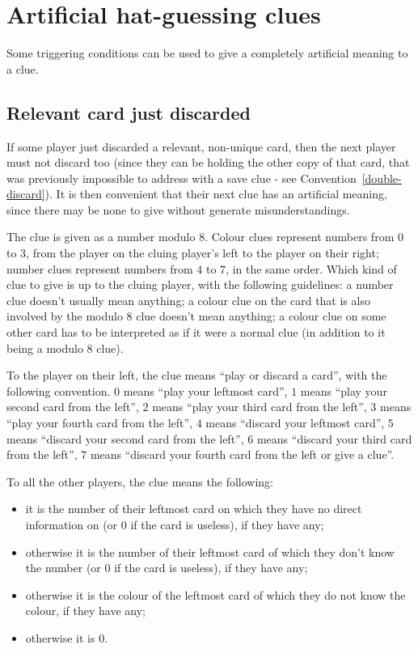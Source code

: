 \documentclass[a4paper]{article}
\theoremstyle{plain}
\theoremstyle{definition}
\begin{document}
\section{Artificial hat-guessing clues}
\label{sec:mod8}

Some triggering conditions can be used to give a completely artificial meaning to a clue.

\subsection{Relevant card just discarded}

If some player just discarded a relevant, non-unique card, then the next player must not discard too (since they can be holding the other copy of that card, that was previously impossible to address with a save clue - see Convention~\ref{double-discard}). It is then convenient that their next clue has an artificial meaning, since there may be none to give without generate misunderstandings.

The clue is given as a number modulo 8. Colour clues represent numbers from $0$ to $3$, from the player on the cluing player's left to the player on their right; number clues represent numbers from $4$ to $7$, in the same order. Which kind of clue to give is up to the cluing player, with the following guidelines: a number clue doesn't usually mean anything; a colour clue on the card that is also involved by the modulo 8 clue doesn't mean anything; a colour clue on some other card has to be interpreted as if it were a normal clue (in addition to it being a modulo 8 clue).

To the player on their left, the clue means ``play or discard a card'', with the following convention. $0$ means ``play your leftmost card'', $1$ means ``play your second card from the left'', $2$ means ``play your third card from the left'', $3$ means ``play your fourth card from the left'', $4$ means ``discard your leftmost card'', $5$ means ``discard your second card from the left'', $6$ means ``discard your third card from the left'', $7$ means ``discard your fourth card from the left or give a clue''.

To all the other players, the clue means the following:

\begin{itemize}
	\item it is the number of their leftmost card on which they have no direct information on (or $0$ if the card is useless), if they have any;
	\item otherwise it is the number of their leftmost card of which they don't know the number (or $0$ if the card is useless), if they have any;
	\item otherwise it is the colour of the leftmost card of which they do not know the colour, if they have any;
	\item otherwise it is $0$. 
\end{itemize}
\end{document}
